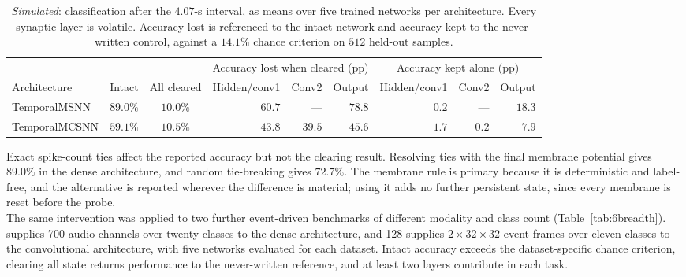 \begin{table}[htbp!]
    \centering
    \caption[Which layers' volatile state the delayed decision needs.]{\emph{Simulated}: 
    classification after the $4.07$-s interval, as means over five trained networks per architecture. Every synaptic
    layer is volatile. Accuracy lost is referenced to the intact network and accuracy kept to the never-written
    control, against a $14.1\%$ chance criterion on $512$ held-out samples.}
    \label{tab:6nmnist}
    \footnotesize
    \setlength{\tabcolsep}{3.2pt}
    \begin{tabular}{@{}lccrrrrrr@{}}
        \toprule
        & & & \multicolumn{3}{c}{Accuracy lost when cleared (pp)} &
        \multicolumn{3}{c}{Accuracy kept alone (pp)} \\
        \cmidrule(lr){4-6} \cmidrule(l){7-9}
        Architecture & Intact & All cleared & Hidden/conv1 & Conv2 & Output & Hidden/conv1 & Conv2 & Output \\
        \midrule
        TemporalMSNN  & $89.0\%$ & $10.0\%$ & $60.7$ & --- & $78.8$ & $0.2$ & --- & $18.3$ \\
        TemporalMCSNN & $59.1\%$ & $10.5\%$ & $43.8$ & $39.5$ & $45.6$ & $1.7$ & $0.2$ & $7.9$ \\
        \bottomrule
    \end{tabular}
\end{table}

\noindent Exact spike-count ties affect the reported accuracy but not the clearing result. Resolving ties with the
final membrane potential gives $89.0\%$ in the dense architecture, and random tie-breaking gives $72.7\%$. The
membrane rule is primary because it is deterministic and label-free, and the alternative is reported wherever the
difference is material; using it adds no further persistent state, since every membrane is reset before the probe.\\

\noindent The same intervention was applied to two further event-driven benchmarks of different modality and class
count (Table~\ref{tab:6breadth}).  \cite{cramer2020shd} supplies 700 audio channels over twenty classes
to the dense architecture, and 128 \cite{amir2017dvsgesture} supplies $2\times32\times32$ event frames
over eleven classes to the convolutional architecture, with five networks evaluated for each dataset. Intact
accuracy exceeds the dataset-specific chance criterion, clearing all state returns performance to the never-written
reference, and at least two layers contribute in each task.\\

